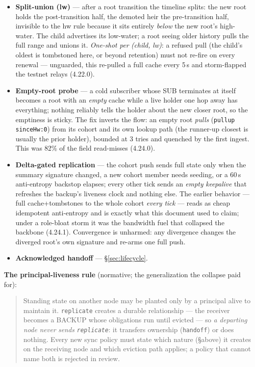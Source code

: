 \documentclass[nobib]{tufte-handout}
\begin{document}
\begin{itemize}
\item \textbf{Split-union (lw)} --- after a root transition the timeline
  splits: the new root holds the post-transition half, the demoted heir
  the pre-transition half, invisible to the hw rule because it sits
  entirely \emph{below} the new root's high-water. The child advertises
  its low-water; a root seeing older history pulls the full range and
  unions it. \emph{One-shot per (child, lw)}: a refused pull (the
  child's oldest is tombstoned here, or beyond retention) must not
  re-fire on every renewal --- unguarded, this re-pulled a full cache
  every 5\,s and storm-flapped the testnet relays (4.22.0).
\item \textbf{Empty-root probe} --- a cold subscriber whose SUB
  terminates at itself becomes a root with an \emph{empty} cache while
  a live holder one hop away has everything; nothing reliably tells the
  holder about the new closer root, so the emptiness is sticky. The
  fix inverts the flow: an empty root \emph{pulls}
  (\texttt{pullup sinceHw:0}) from its cohort and its own lookup path
  (the runner-up closest is usually the prior holder), bounded at 3
  tries and quenched by the first ingest. This was 82\% of the field
  read-misses (4.24.0).
\item \textbf{Delta-gated replication} --- the cohort push sends full
  state only when the summary signature changed, a new cohort member
  needs seeding, or a 60\,s anti-entropy backstop elapses; every other
  tick sends an \emph{empty keepalive} that refreshes the backup's
  liveness clock and nothing else. The earlier behavior --- full
  cache+tombstones to the whole cohort \emph{every tick} --- reads as
  cheap idempotent anti-entropy and is exactly what this document used
  to claim; under a role-bloat storm it was the bandwidth fuel that
  collapsed the backbone (4.24.1). Convergence is unharmed: any
  divergence changes the diverged root's own signature and re-arms one
  full push.
\item \textbf{Acknowledged handoff} --- \S\ref{sec:lifecycle}.
\end{itemize}

\textbf{The principal-liveness rule} (normative; the generalization the
collapse paid for):

\begin{quote}
Standing state on another node may be planted only by a principal
alive to maintain it. \texttt{replicate} creates a durable
relationship --- the receiver becomes a BACKUP whose obligations run
until evicted --- so \emph{a departing node never sends
\texttt{replicate}}: it transfers ownership (\texttt{handoff}) or does
nothing. Every new sync policy must state which nature (\S above) it
creates on the receiving node and which eviction path applies; a
policy that cannot name both is rejected in review.
\end{quote}
\end{document}
